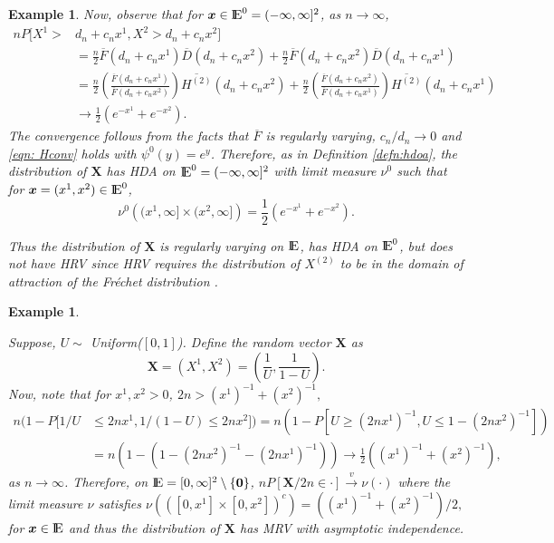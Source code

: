 \documentclass[11 pt]{amsart}
\newtheorem{ex}[thm]{Example}
\numberwithin{equation}{section}
\begin{document}
{\begin{ex}
{{Now, observe that for ${\boldsymbol x} \in {\mathop{\rm I\kern -0.20em E}\nolimits}^0 = (-\infty, \infty]^2$, as $n \to \infty$,
\begin{align*}
nP[ X^1 >& d_n+ c_nx^1,  X^2 > d_n + c_nx^2]  \\
&= \frac{n}{2}\overline F\left(d_n+ c_nx^1 \right)\overline D
\left(d_n+ c_nx^2 \right) + \frac{n}{2}\overline F\left(d_n+ c_nx^2
\right)\overline D \left(d_n+ c_nx^1 \right)\\ 
&= \frac{n}{2}\left( \frac{\overline F\left(d_n+ c_nx^1 \right)}{
    \overline F\left(d_n+ c_nx^2 \right)} \right)\overline {H^{(2)}}
\left(d_n+ c_nx^2 \right) 
+  \frac{n}{2}\left( \frac{\overline F\left(d_n+ c_nx^2
    \right)}{ \overline F\left(d_n+ c_nx^1 \right)} \right)\overline
{H^{(2)}} \left(d_n+ c_nx^1 \right) \\ 
& \rightarrow \frac{1}{2}( e^{-x^1} + e^{-x^2} ).
\end{align*}
 The convergence follows from the facts that $\overline F$ is regularly varying, $c_n/d_n \to 0$ and \eqref{eqn: Hconv} holds with $\psi^0(y) = e^y$. 
Therefore, as in Definition \ref{defn:hdoa}, the distribution of ${\boldsymbol X}$  has HDA  on ${\mathop{\rm I\kern -0.20em E}\nolimits}^0 = (-\infty, \infty]^2$ with limit measure $\nu^0$ such that for ${\boldsymbol x} = (x^1, x^2) \in {\mathop{\rm I\kern -0.20em E}\nolimits}^0$,
$$ \nu^0\left((x^1, \infty] \times (x^2, \infty] \right) = \frac{1}{2}( e^{-x^1} + e^{-x^2} ).$$

Thus the distribution of  ${\boldsymbol X}$  is regularly varying on ${\mathop{\rm I\kern -0.20em E}\nolimits}$, has
HDA on ${\mathop{\rm I\kern -0.20em E}\nolimits}^0$, but does not have HRV since HRV
requires the distribution of $X^{(2)}$ to be in the domain of
attraction of the Fr\'{e}chet distribution \citep[page
54]{resnickbook:2008}. 
}}
\end{ex}

\begin{ex}\label{eg:unif}
{\rm{ 
Suppose, $U \sim$ Uniform($[0, 1]$). Define the random vector ${\boldsymbol X}$ as 
$${\boldsymbol X} = (X^1, X^2) = \left( \frac{1}{U}, \frac{1}{1-U} \right).$$
Now, note that for $x^1, x^2 > 0$, $2n > {(x^1)}^{-1} + {(x^2)}^{-1},$
\begin{align*}
n(1- P[ 1/U  & \le  2nx^1, 1/(1-U)  \le 2nx^2])
= n(1- P[ U \ge {(2nx^1)}^{-1}, U \le 1 - {(2nx^2)}^{-1}]) \\
&= n(1- (1 - {(2nx^2)}^{-1} - {(2nx^1)}^{-1}))
 \rightarrow \frac{1}{2}( {(x^1)}^{-1} + {(x^2)}^{-1} ),
\end{align*}
as $n \to \infty$. Therefore, on ${\mathop{\rm I\kern -0.20em E}\nolimits} = [0, \infty]^2 \setminus \{{\boldsymbol 0}\}$,
$nP\left[ {\boldsymbol X}/{2n} \in \cdot \right] \stackrel{v}{\rightarrow} \nu(\cdot)$
 where the limit measure $\nu$ satisfies
$\nu \left( {\left( [0, x^1] \times [0, x^2] \right)}^c \right) =
({(x^1)}^{-1} +
  {(x^2)}^{-1})/2,$ for ${\boldsymbol x} \in {\mathop{\rm I\kern -0.20em E}\nolimits}$ and thus
 the distribution of ${\boldsymbol X}$ has MRV with asymptotic independence. 

}}
\end{ex}}
\end{document}
